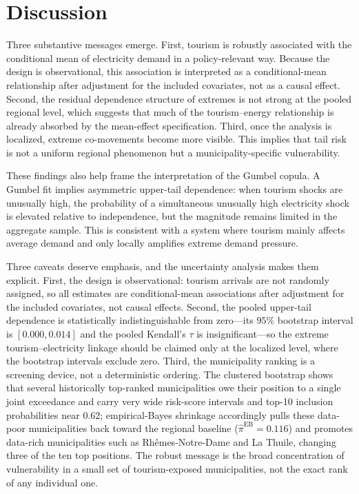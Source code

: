 \documentclass[11pt,a4paper]{article}
\begin{document}
\section{Discussion}

Three substantive messages emerge. First, tourism is robustly associated with the conditional mean of electricity demand in a policy-relevant way. Because the design is observational, this association is interpreted as a conditional-mean relationship after adjustment for the included covariates, not as a causal effect. Second, the residual dependence structure of extremes is not strong at the pooled regional level, which suggests that much of the tourism--energy relationship is already absorbed by the mean-effect specification. Third, once the analysis is localized, extreme co-movements become more visible. This implies that tail risk is not a uniform regional phenomenon but a municipality-specific vulnerability.

These findings also help frame the interpretation of the Gumbel copula. A Gumbel fit implies asymmetric upper-tail dependence: when tourism shocks are unusually high, the probability of a simultaneous unusually high electricity shock is elevated relative to independence, but the magnitude remains limited in the aggregate sample. This is consistent with a system where tourism mainly affects average demand and only locally amplifies extreme demand pressure.

Three caveats deserve emphasis, and the uncertainty analysis makes them explicit. First, the design is observational: tourism arrivals are not randomly assigned, so all estimates are conditional-mean associations after adjustment for the included covariates, not causal effects. Second, the pooled upper-tail dependence is statistically indistinguishable from zero---its $95\%$ bootstrap interval is $[0.000, 0.014]$ and the pooled Kendall's $\tau$ is insignificant---so the extreme tourism--electricity linkage should be claimed only at the localized level, where the bootstrap intervals exclude zero. Third, the municipality ranking is a screening device, not a deterministic ordering. The clustered bootstrap shows that several historically top-ranked municipalities owe their position to a single joint exceedance and carry very wide risk-score intervals and top-10 inclusion probabilities near $0.62$; empirical-Bayes shrinkage accordingly pulls these data-poor municipalities back toward the regional baseline ($\widehat{\pi}^{\mathrm{EB}}=0.116$) and promotes data-rich municipalities such as Rh\^emes-Notre-Dame and La Thuile, changing three of the ten top positions. The robust message is the broad concentration of vulnerability in a small set of tourism-exposed municipalities, not the exact rank of any individual one.
\end{document}

